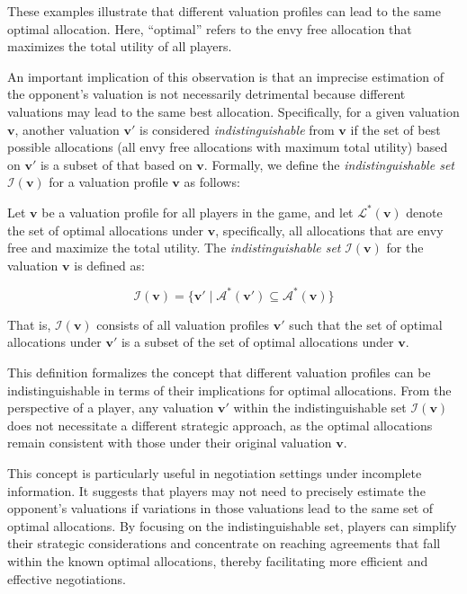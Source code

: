 These examples illustrate that different valuation profiles can lead to the same optimal allocation. Here, ``optimal'' refers to the envy free allocation that maximizes the total utility of all players.

An important implication of this observation is that an imprecise estimation of the opponent's valuation is not necessarily detrimental because different valuations may lead to the same best allocation. Specifically, for a given valuation $\mathbf{v}$, another valuation $\mathbf{v}'$ is considered \emph{indistinguishable} from $\mathbf{v}$ if the set of best possible allocations (all envy free allocations with maximum total utility) based on $\mathbf{v}'$ is a subset of that based on $\mathbf{v}$.  Formally, we define the \emph{indistinguishable set} $\mathcal{I}(\mathbf{v})$ for a valuation profile $\mathbf{v}$ as follows:

\begin{definition}
Let $\mathbf{v}$ be a valuation profile for all players in the game, and let $\mathcal{L}^*(\mathbf{v})$ denote the set of optimal allocations under $\mathbf{v}$, specifically, all allocations that are envy free and maximize the total utility. The \emph{indistinguishable set} $\mathcal{I}(\mathbf{v})$ for the valuation $\mathbf{v}$ is defined as:

$$\mathcal{I}(\mathbf{v}) = \{\mathbf{v}'\mid \mathcal{A}^*(\mathbf{v}')\subseteq\mathcal{A}^*(\mathbf{v})\}$$

That is, $\mathcal{I}(\mathbf{v})$ consists of all valuation profiles $\mathbf{v}'$ such that the set of optimal allocations under $\mathbf{v}'$ is a subset of the set of optimal allocations under $\mathbf{v}$.
\end{definition}

This definition formalizes the concept that different valuation profiles can be indistinguishable in terms of their implications for optimal allocations. From the perspective of a player, any valuation $\mathbf{v}'$ within the indistinguishable set $\mathcal{I}(\mathbf{v})$ does not necessitate a different strategic approach, as the optimal allocations remain consistent with those under their original valuation $\mathbf{v}$.

This concept is particularly useful in negotiation settings under incomplete information. It suggests that players may not need to precisely estimate the opponent's valuations if variations in those valuations lead to the same set of optimal allocations. By focusing on the indistinguishable set, players can simplify their strategic considerations and concentrate on reaching agreements that fall within the known optimal allocations, thereby facilitating more efficient and effective negotiations.

